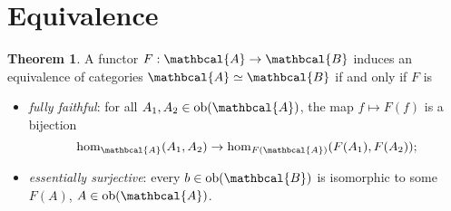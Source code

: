 \documentclass[a4paper, 10pt]{article}
\newcommand{\ob}{\text{ob}}
\newcommand{\sA}{\mathbcal{A}}
\newcommand{\sB}{\mathbcal{B}}
\theoremstyle{definition}
\newtheorem{theorem}[definition]{Theorem}
\theoremstyle{remark}
\theoremstyle{remark}
\begin{document}
\section{Equivalence}

\begin{theorem}
    A functor $F: \sA \to \sB$ induces an equivalence of categories $\sA \simeq \sB$ if and only if $F$ is
    \begin{itemize}
        \item \emph{fully faithful}: for all $A_1, A_2 \in \ob (\sA)$, the map $f \mapsto F(f)$ is a bijection 
        \begin{equation*}
            \hom_{\sA} (A_1, A_2) \to \hom_{F(\sA)} (F(A_1), F(A_2)) ;
        \end{equation*}
        \item \emph{essentially surjective}: every $b \in \ob (\sB)$ is isomorphic to some $F(A)$, $A \in \ob (\sA)$. 
    \end{itemize}
\end{theorem}


\nocite{*}
\printbibliography
\end{document}
